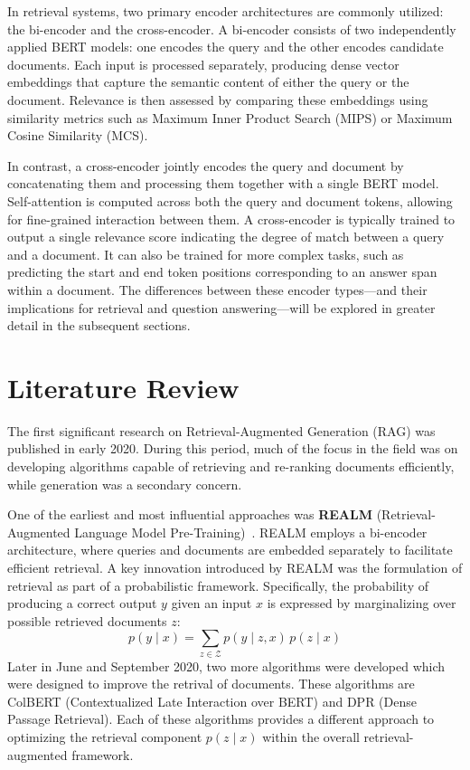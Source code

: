 \documentclass[twocolumn, 10pt]{article}
\begin{document}
In retrieval systems, two primary encoder architectures are commonly utilized: the bi-encoder and the cross-encoder. A bi-encoder consists of two independently applied BERT models: one encodes the query and the other encodes candidate documents. Each input is processed separately, producing dense vector embeddings that capture the semantic content of either the query or the document. Relevance is then assessed by comparing these embeddings using similarity metrics such as Maximum Inner Product Search (MIPS) or Maximum Cosine Similarity (MCS).

In contrast, a cross-encoder jointly encodes the query and document by concatenating them and processing them together with a single BERT model. Self-attention is computed across both the query and document tokens, allowing for fine-grained interaction between them. A cross-encoder is typically trained to output a single relevance score indicating the degree of match between a query and a document. It can also be trained for more complex tasks, such as predicting the start and end token positions corresponding to an answer span within a document. The differences between these encoder types—and their implications for retrieval and question answering—will be explored in greater detail in the subsequent sections.

\section{Literature Review}

The first significant research on Retrieval-Augmented Generation (RAG) was published in early 2020. During this period, much of the focus in the field was on developing algorithms capable of retrieving and re-ranking documents efficiently, while generation was a secondary concern.

One of the earliest and most influential approaches was \textbf{REALM} (Retrieval-Augmented Language Model Pre-Training)~\cite{guu2020realm}. REALM employs a bi-encoder architecture, where queries and documents are embedded separately to facilitate efficient retrieval. A key innovation introduced by REALM was the formulation of retrieval as part of a probabilistic framework. Specifically, the probability of producing a correct output \( y \) given an input \( x \) is expressed by marginalizing over possible retrieved documents \( z \):
\begingroup
\begin{equation*}
p(y \mid x) = \sum_{z \in \mathcal{Z}} p(y \mid z, x) \, p(z \mid x)
\end{equation*}
\endgroup
Later in June and September 2020, two more algorithms were developed which were designed to improve the retrival of documents. These algorithms are ColBERT (Contextualized Late Interaction over BERT) and DPR (Dense Passage Retrieval). Each of these algorithms provides a different approach to optimizing the retrieval component \( p(z \mid x) \) within the overall retrieval-augmented framework.
\noindent
\end{document}
